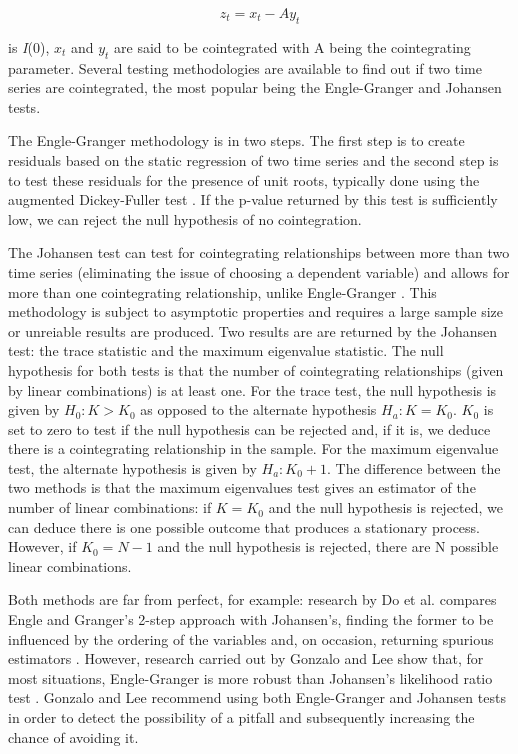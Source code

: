 \documentclass{UoYCSproject}
\begin{document}
\[z_t = x_t - Ay_t\]

is \emph{I}(0), $x_t$ and $y_t$ are said to be cointegrated with A being the cointegrating parameter. Several testing methodologies are available to find out if two time series are cointegrated, the most popular being the Engle-Granger and Johansen tests.

The Engle-Granger methodology is in two steps. The first step is to create residuals based on the static regression of two time series and the second step is to test these residuals for the presence of unit roots, typically done using the augmented Dickey-Fuller test \parencite{englegranger} \parencite{adf}. If the p-value returned by this test is sufficiently low, we can reject the null hypothesis of no cointegration.

The Johansen test can test for cointegrating relationships between more than two time series (eliminating the issue of choosing a dependent variable) and allows for more than one cointegrating relationship, unlike Engle-Granger \parencite{johansen}. This methodology is subject to asymptotic properties and requires a large sample size or unreiable results are produced. Two results are are returned by the Johansen test: the trace statistic and the maximum eigenvalue statistic. The null hypothesis for both tests is that the number of cointegrating relationships (given by linear combinations) is at least one. For the trace test, the null hypothesis is given by $H_0: K > K_0$ as opposed to the alternate hypothesis $H_a: K = K_0$. $K_0$ is set to zero to test if the null hypothesis can be rejected and, if it is, we deduce there is a cointegrating relationship in the sample. For the maximum eigenvalue test, the alternate hypothesis is given by $H_a: K_0 + 1$. The difference between the two methods is that the maximum eigenvalues test gives an estimator of the number of linear combinations: if $K = K_0$ and the null hypothesis is rejected, we can deduce there is one possible outcome that produces a stationary process. However, if $K_0 = N - 1$ and the null hypothesis is rejected, there are N possible linear combinations.

Both methods are far from perfect, for example: research by Do et al. compares Engle and Granger’s 2-step approach with Johansen’s, finding the former to be influenced by the ordering of the variables and, on occasion, returning spurious estimators \parencite{cointcompared}. However, research carried out by Gonzalo and Lee show that, for most situations, Engle-Granger is more robust than Johansen's likelihood ratio test \parencite{englegrangerjohansen}. Gonzalo and Lee recommend using both Engle-Granger and Johansen tests in order to detect the possibility of a pitfall and subsequently increasing the chance of avoiding it.
\end{document}

